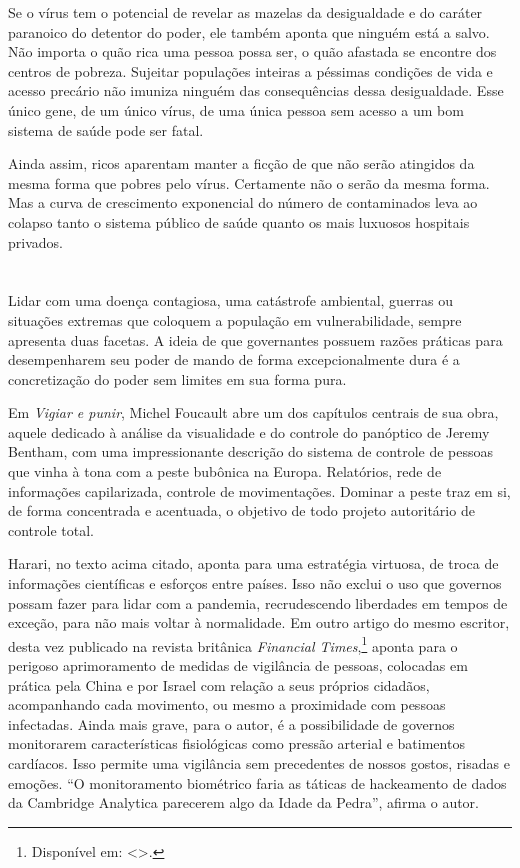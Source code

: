 Se o vírus tem o potencial de revelar as mazelas da desigualdade e do
caráter paranoico do detentor do poder, ele também aponta que ninguém
está a salvo. Não importa o quão rica uma pessoa possa ser, o quão
afastada se encontre dos centros de pobreza. Sujeitar populações
inteiras a péssimas condições de vida e acesso precário não imuniza
ninguém das consequências dessa desigualdade. Esse único gene, de um
único vírus, de uma única pessoa sem acesso a um bom sistema de saúde
pode ser fatal.

Ainda assim, ricos aparentam manter a ficção de que não serão atingidos
da mesma forma que pobres pelo vírus. Certamente não o serão da mesma
forma. Mas a curva de crescimento exponencial do número de contaminados
leva ao colapso tanto o sistema público de saúde quanto os mais luxuosos
hospitais privados.

\section*{}

Lidar com uma doença contagiosa, uma catástrofe ambiental, guerras ou
situações extremas que coloquem a população em vulnerabilidade, sempre
apresenta duas facetas. A ideia de que governantes possuem razões
práticas para desempenharem seu poder de mando de forma excepcionalmente
dura é a concretização do poder sem limites em sua forma pura.

Em \emph{Vigiar e punir}, Michel Foucault abre um dos capítulos centrais
de sua obra, aquele dedicado à análise da visualidade e do controle do
panóptico de Jeremy Bentham, com uma impressionante descrição do sistema
de controle de pessoas que vinha à tona com a peste bubônica na Europa.
Relatórios, rede de informações capilarizada, controle de movimentações.
Dominar a peste traz em si, de forma concentrada e acentuada, o objetivo
de todo projeto autoritário de controle total.

Harari, no texto acima citado, aponta para uma estratégia virtuosa, de
troca de informações científicas e esforços entre países. Isso não
exclui o uso que governos possam fazer para lidar com a pandemia,
recrudescendo liberdades em tempos de exceção, para não mais voltar à
normalidade. Em outro artigo do mesmo escritor, desta vez publicado na
revista britânica \emph{Financial
Times},\footnote{Disponível em: \textless{}{}\textgreater{}.} aponta para o perigoso aprimoramento de medidas de vigilância
de pessoas, colocadas em prática pela China e por Israel com relação a
seus próprios cidadãos, acompanhando cada movimento, ou mesmo a
proximidade com pessoas infectadas. Ainda mais grave, para o autor, é a
possibilidade de governos monitorarem características fisiológicas como
pressão arterial e batimentos cardíacos. Isso permite uma vigilância sem
precedentes de nossos gostos, risadas e emoções. ``O monitoramento
biométrico faria as táticas de hackeamento de dados da Cambridge
Analytica parecerem algo da Idade da Pedra'', afirma o autor.

